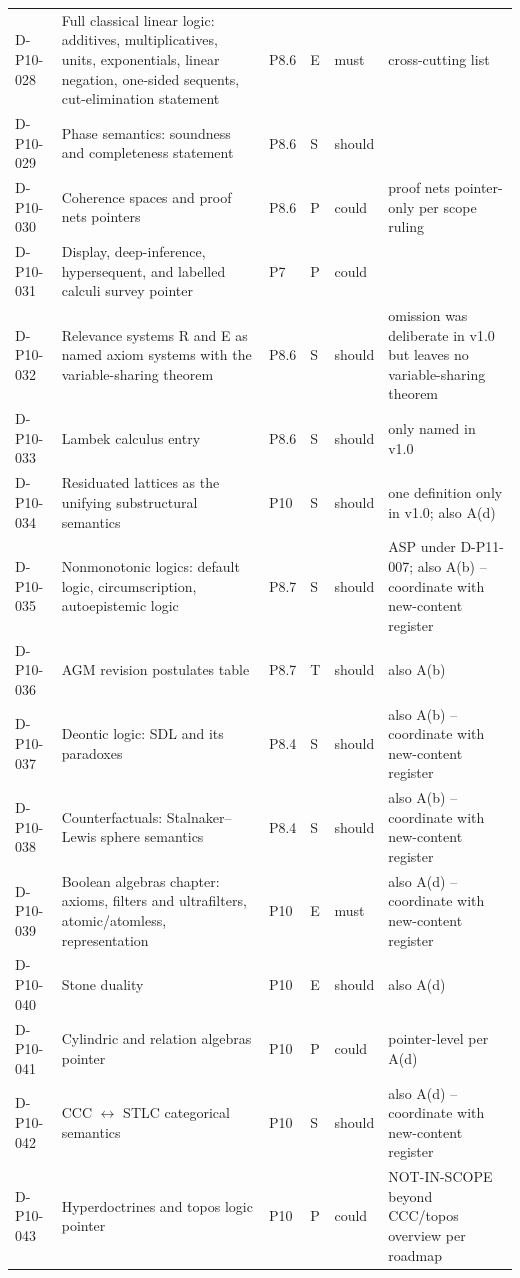 \begin{longtable}{@{}p{0.62in}p{2.6in}p{0.75in}p{0.22in}p{0.42in}p{1.85in}@{}}
D-P10-028 & Full classical linear logic: additives, multiplicatives, units, exponentials, linear negation, one-sided sequents, cut-elimination statement & P8.6 & E & must & cross-cutting list \\
D-P10-029 & Phase semantics: soundness and completeness statement & P8.6 & S & should &  \\
D-P10-030 & Coherence spaces and proof nets pointers & P8.6 & P & could & proof nets pointer-only per scope ruling \\
D-P10-031 & Display, deep-inference, hypersequent, and labelled calculi survey pointer & P7 & P & could &  \\
D-P10-032 & Relevance systems R and E as named axiom systems with the variable-sharing theorem & P8.6 & S & should & omission was deliberate in v1.0 but leaves no variable-sharing theorem \\
D-P10-033 & Lambek calculus entry & P8.6 & S & should & only named in v1.0 \\
D-P10-034 & Residuated lattices as the unifying substructural semantics & P10 & S & should & one definition only in v1.0; also A(d) \\
D-P10-035 & Nonmonotonic logics: default logic, circumscription, autoepistemic logic & P8.7 & S & should & ASP under D-P11-007; also A(b) -- coordinate with new-content register \\
D-P10-036 & AGM revision postulates table & P8.7 & T & should & also A(b) \\
D-P10-037 & Deontic logic: SDL and its paradoxes & P8.4 & S & should & also A(b) -- coordinate with new-content register \\
D-P10-038 & Counterfactuals: Stalnaker--Lewis sphere semantics & P8.4 & S & should & also A(b) -- coordinate with new-content register \\
D-P10-039 & Boolean algebras chapter: axioms, filters and ultrafilters, atomic/atomless, representation & P10 & E & must & also A(d) -- coordinate with new-content register \\
D-P10-040 & Stone duality & P10 & E & should & also A(d) \\
D-P10-041 & Cylindric and relation algebras pointer & P10 & P & could & pointer-level per A(d) \\
D-P10-042 & CCC \(\leftrightarrow\) STLC categorical semantics & P10 & S & should & also A(d) -- coordinate with new-content register \\
D-P10-043 & Hyperdoctrines and topos logic pointer & P10 & P & could & NOT-IN-SCOPE beyond CCC/topos overview per roadmap \\

\end{longtable}
